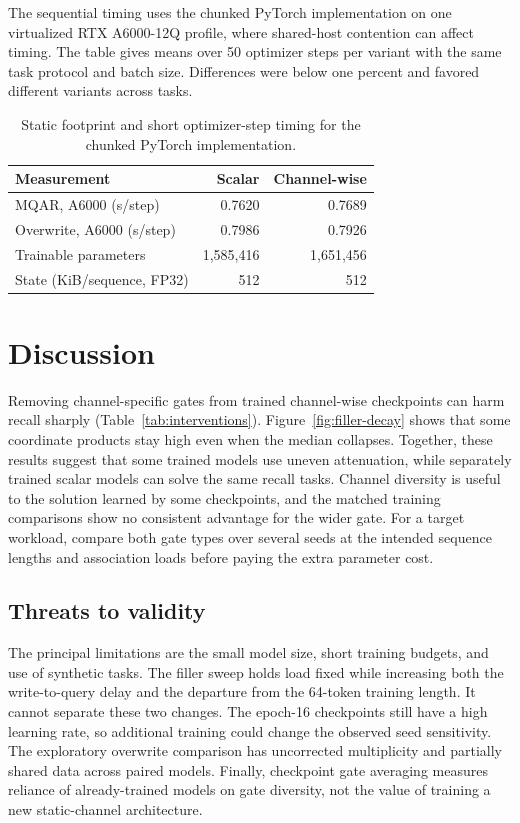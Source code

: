 \documentclass[conference]{IEEEtran}
\begin{document}
The sequential timing uses the chunked PyTorch implementation on one virtualized RTX A6000-12Q profile, where shared-host contention can affect timing. The table gives means over 50 optimizer steps per variant with the same task protocol and batch size. Differences were below one percent and favored different variants across tasks.

\begin{table}[t]
\caption{Static footprint and short optimizer-step timing for the chunked PyTorch implementation.}
\label{tab:cost}
\centering
\small
\begin{tabular}{lrr}
\toprule
Measurement & Scalar & Channel-wise \\
\midrule
MQAR, A6000 (s/step) & 0.7620 & 0.7689 \\
Overwrite, A6000 (s/step) & 0.7986 & 0.7926 \\
Trainable parameters & 1,585,416 & 1,651,456 \\
State (KiB/sequence, FP32) & 512 & 512 \\
\bottomrule
\end{tabular}
\end{table}

\section{Discussion}
Removing channel-specific gates from trained channel-wise checkpoints can harm recall sharply (Table~\ref{tab:interventions}). Figure~\ref{fig:filler-decay} shows that some coordinate products stay high even when the median collapses. Together, these results suggest that some trained models use uneven attenuation, while separately trained scalar models can solve the same recall tasks. Channel diversity is useful to the solution learned by some checkpoints, and the matched training comparisons show no consistent advantage for the wider gate. For a target workload, compare both gate types over several seeds at the intended sequence lengths and association loads before paying the extra parameter cost.

\subsection{Threats to validity}
The principal limitations are the small model size, short training budgets, and use of synthetic tasks. The filler sweep holds load fixed while increasing both the write-to-query delay and the departure from the 64-token training length. It cannot separate these two changes. The epoch-16 checkpoints still have a high learning rate, so additional training could change the observed seed sensitivity. The exploratory overwrite comparison has uncorrected multiplicity and partially shared data across paired models. Finally, checkpoint gate averaging measures reliance of already-trained models on gate diversity, not the value of training a new static-channel architecture.
\end{document}
